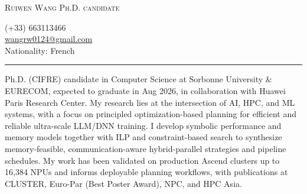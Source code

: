 \documentclass[a4paper,9pt]{article}
\begin{document}
\begin{minipage}[t]{0.62\textwidth}
  {\Calluna \fontsize{29pt}{29pt}\selectfont \textsc{Ruiwen Wang}} \quad
  {\Calluna \fontsize{14pt}{14pt}\selectfont \textsc{Ph.D. candidate}}
\end{minipage}
\hfill
\begin{minipage}[t]{0.34\textwidth}
  \raggedleft
  {\Calluna (+33) 663113466}\\
  {\Calluna \href{mailto:wangrw0124@gmail.com}{wangrw0124@gmail.com}}\\
  {\Calluna Nationality: French}
\end{minipage}

\vspace{4pt}
\noindent\textcolor{RuleColor}{\rule{\textwidth}{0.45pt}}
\vspace{6pt}

{
Ph.D. (CIFRE) candidate in Computer Science at Sorbonne University \& EURECOM, expected to graduate in Aug 2026, in collaboration with Huawei Paris Research Center. My research lies at the intersection of AI, HPC, and ML systems, with a focus on principled optimization-based planning for efficient and reliable ultra-scale LLM/DNN training. I develop symbolic performance and memory models together with ILP and constraint-based search to synthesize memory-feasible, communication-aware hybrid-parallel strategies and pipeline schedules. My work has been validated on production Ascend clusters up to 16,384 NPUs and informs deployable planning workflows, with publications at CLUSTER, Euro-Par (Best Poster Award), NPC, and HPC Asia.
}

{
\itemListStart
\itemListEnd
}
\end{document}
